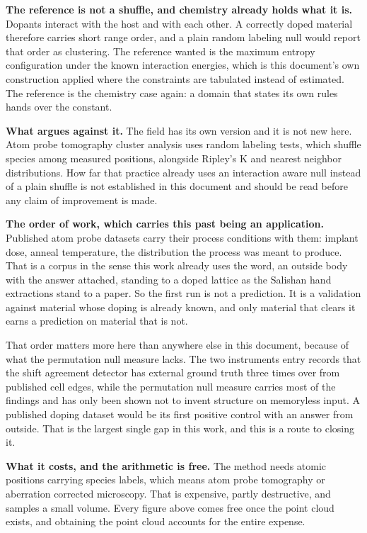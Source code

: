 \textbf{The reference is not a shuffle, and chemistry already holds what it is.} Dopants interact with the host and with each other. A correctly doped material therefore carries short range order, and a plain random labeling null would report that order as clustering. The reference wanted is the maximum entropy configuration under the known interaction energies, which is this document's own construction applied where the constraints are tabulated instead of estimated. The reference is the chemistry case again: a domain that states its own rules hands over the constant.

\textbf{What argues against it.} The field has its own version and it is not new here. Atom probe tomography cluster analysis uses random labeling tests, which shuffle species among measured positions, alongside Ripley's K and nearest neighbor distributions. How far that practice already uses an interaction aware null instead of a plain shuffle is not established in this document and should be read before any claim of improvement is made.

\textbf{The order of work, which carries this past being an application.} Published atom probe datasets carry their process conditions with them: implant dose, anneal temperature, the distribution the process was meant to produce. That is a corpus in the sense this work already uses the word, an outside body with the answer attached, standing to a doped lattice as the Salishan hand extractions stand to a paper. So the first run is not a prediction. It is a validation against material whose doping is already known, and only material that clears it earns a prediction on material that is not.

That order matters more here than anywhere else in this document, because of what the permutation null measure lacks. The two instruments entry records that the shift agreement detector has external ground truth three times over from published cell edges, while the permutation null measure carries most of the findings and has only been shown not to invent structure on memoryless input. A published doping dataset would be its first positive control with an answer from outside. That is the largest single gap in this work, and this is a route to closing it.

\textbf{What it costs, and the arithmetic is free.} The method needs atomic positions carrying species labels, which means atom probe tomography or aberration corrected microscopy. That is expensive, partly destructive, and samples a small volume. Every figure above comes free once the point cloud exists, and obtaining the point cloud accounts for the entire expense.

